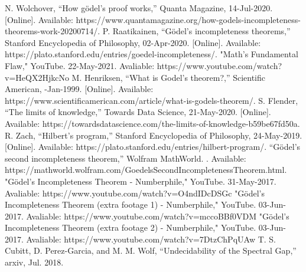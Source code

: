 \documentclass[conference]{IEEEtran}
\begin{document}
\begin{thebibliography}{00}
     N. Wolchover, “How gödel's proof works,” Quanta Magazine, 14-Jul-2020. [Online]. Available: https://www.quantamagazine.org/how-godels-incompleteness-theorems-work-20200714/.
     P. Raatikainen, “Gödel's incompleteness theorems,” Stanford \break Encyclopedia of Philosophy, 02-Apr-2020. [Online]. Available: https://plato.stanford.edu/entries/goedel-incompleteness/. 
     "Math's Fundamental Flaw," YouTube. 22-May-2021. Avaliable: https://www.youtube.com/watch?v=HeQX2HjkcNo
     M. Henriksen, “What is Godel's theorem?,” Scientific American, -Jan-1999. [Online]. Available:  https://www.scientificamerican.com/\break article/what-is-godels-theorem/. 
     S. Flender, “The limits of knowledge,” Towards Data Science, 21-May-2020. [Online]. Available: https://towardsdatascience.com/the-limits-of-knowledge-b59be67fd50a. 
     R. Zach, “Hilbert's program,” Stanford Encyclopedia of Philosophy, 24-May-2019. [Online]. Available: https://plato.stanford.edu/entries/hilbert-program/. 
     “Gödel's second incompleteness theorem,” Wolfram MathWorld. \break [Online]. Available: https://mathworld.wolfram.com/GoedelsSecond\break IncompletenessTheorem.html. 
     "Gödel's Incompleteness Theorem - Numberphile," YouTube. 31-May-2017. Avaliable: https://www.youtube.com/watch?v=O4ndIDcDSGc
     "Gödel's Incompleteness Theorem (extra footage 1) - Numberphile," \break YouTube. 03-Jun-2017. Avaliable: https://www.youtube.com/watch?v=\break mccoBBf0VDM
     "Gödel's Incompleteness Theorem (extra footage 2) - Numberphile," \break YouTube. 03-Jun-2017. Avaliable: https://www.youtube.com/watch?v=\break 7DtzChPqUAw
     T. S. Cubitt, D. Perez-Garcia, and M. M. Wolf, “Undecidability of the Spectral Gap,” arxiv, Jul. 2018. 
\end{thebibliography}
\end{document}

